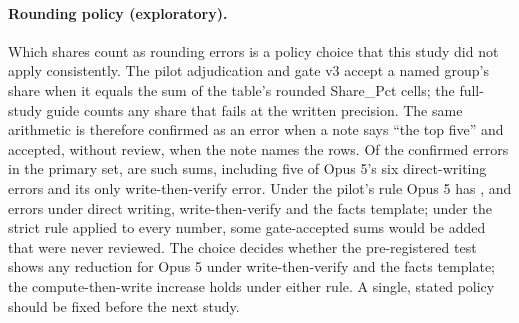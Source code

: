 \documentclass[11pt]{article}
\begin{document}
\paragraph{Rounding policy (exploratory).} Which shares count as rounding errors is a policy choice that this study did not apply consistently. The pilot adjudication and gate v3 accept a named group's share when it equals the sum of the table's rounded Share\_Pct cells; the full-study guide counts any share that fails at the written precision. The same arithmetic is therefore confirmed as an error when a note says ``the top five'' and accepted, without review, when the note names the rows. Of the confirmed errors in the primary set, \ShareSumN{} are such sums, including five of Opus 5's six direct-writing errors and its only write-then-verify error. Under the pilot's rule Opus 5 has \PilotRuleOpusOne{}, \PilotRuleOpusThree{} and \PilotRuleOpusFour{} errors under direct writing, write-then-verify and the facts template; under the strict rule applied to every number, some gate-accepted sums would be added that were never reviewed. The choice decides whether the pre-registered test shows any reduction for Opus 5 under write-then-verify and the facts template; the compute-then-write increase holds under either rule. A single, stated policy should be fixed before the next study.

\begin{table}[t]
\centering
\caption{The gate's own rates (pre-registered outcomes 1 and 2), primary set: unsupported numbers (Level~1), binding errors (Wrong\_entity and Wrong\_metric claims) and all claim errors (binding plus Wrong\_value), as percentages, with 95 percent intervals from resampling tables (* no event: the exact upper bound instead); strategies as in Table~\ref{tab:full}. These are raw gate rates, before review.}
\label{tab:gaterates}

\end{table}
\end{document}
